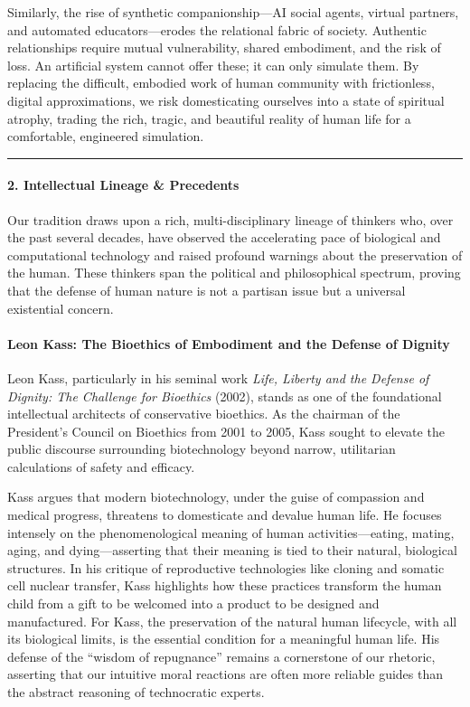 Similarly, the rise of synthetic companionship---AI social agents,
virtual partners, and automated educators---erodes the relational fabric
of society. Authentic relationships require mutual vulnerability, shared
embodiment, and the risk of loss. An artificial system cannot offer
these; it can only simulate them. By replacing the difficult, embodied
work of human community with frictionless, digital approximations, we
risk domesticating ourselves into a state of spiritual atrophy, trading
the rich, tragic, and beautiful reality of human life for a comfortable,
engineered simulation.

\begin{center}\rule{0.5\linewidth}{0.5pt}\end{center}

\paragraph{2. Intellectual Lineage \&
Precedents}\label{intellectual-lineage-precedents-33}

Our tradition draws upon a rich, multi-disciplinary lineage of thinkers
who, over the past several decades, have observed the accelerating pace
of biological and computational technology and raised profound warnings
about the preservation of the human. These thinkers span the political
and philosophical spectrum, proving that the defense of human nature is
not a partisan issue but a universal existential concern.

\paragraph{Leon Kass: The Bioethics of Embodiment and the Defense of
Dignity}\label{leon-kass-the-bioethics-of-embodiment-and-the-defense-of-dignity}

Leon Kass, particularly in his seminal work \emph{Life, Liberty and the
Defense of Dignity: The Challenge for Bioethics} (2002), stands as one
of the foundational intellectual architects of conservative bioethics.
As the chairman of the President's Council on Bioethics from 2001 to
2005, Kass sought to elevate the public discourse surrounding
biotechnology beyond narrow, utilitarian calculations of safety and
efficacy.

Kass argues that modern biotechnology, under the guise of compassion and
medical progress, threatens to domesticate and devalue human life. He
focuses intensely on the phenomenological meaning of human
activities---eating, mating, aging, and dying---asserting that their
meaning is tied to their natural, biological structures. In his critique
of reproductive technologies like cloning and somatic cell nuclear
transfer, Kass highlights how these practices transform the human child
from a gift to be welcomed into a product to be designed and
manufactured. For Kass, the preservation of the natural human lifecycle,
with all its biological limits, is the essential condition for a
meaningful human life. His defense of the ``wisdom of repugnance''
remains a cornerstone of our rhetoric, asserting that our intuitive
moral reactions are often more reliable guides than the abstract
reasoning of technocratic experts.

